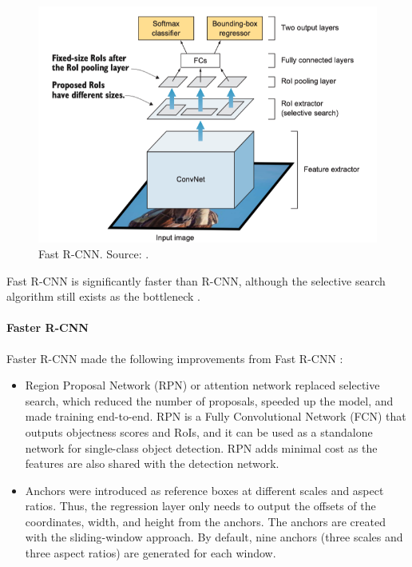 \documentclass[a4paper, 11pt, oneside]{article}
\begin{document}
\begin{figure}[ht]
  \begin{center}
    \includegraphics[width=.8\textwidth]{fast_r_cnn.png}
  \end{center}
  \caption{Fast R-CNN. Source: \cite{elgendy2020deep}.}
\end{figure}

Fast R-CNN is significantly faster than R-CNN, although the selective search algorithm still exists as the bottleneck
\cite{elgendy2020deep, girshick2015fast, ren2015faster}.

\paragraph{Faster R-CNN}

Faster R-CNN made the following improvements from Fast R-CNN \cite{elgendy2020deep, ren2015faster}:

\begin{itemize}
  \item Region Proposal Network (RPN) or attention network replaced selective search, which reduced the number of
  proposals, speeded up the model, and made training end-to-end. RPN is a Fully Convolutional Network (FCN)
  \cite{long2015fully} that outputs objectness scores and RoIs, and it can be used as a standalone network for
  single-class object detection. RPN adds minimal cost as the features are also shared with the detection network.
  \item Anchors were introduced as reference boxes at different scales and aspect ratios. Thus, the regression layer
  only needs to output the offsets of the coordinates, width, and height from the anchors. The anchors are created with
  the sliding-window approach. By default, nine anchors (three scales and three aspect ratios) are generated for each window.
\end{itemize}
\end{document}
